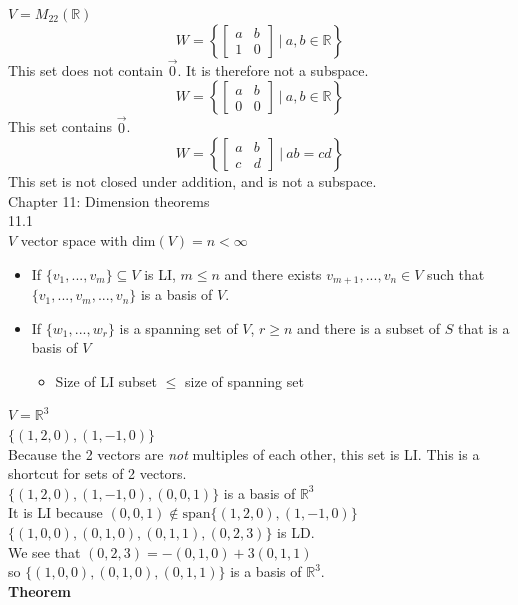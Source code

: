 \documentclass[]{article}
\begin{document}
		$V=M_{22}(\mathbb{R})$\\
		$$W=\left\{\begin{bmatrix}{a}&{b}\\{1}&{0}\end{bmatrix}~|~a,b\in\mathbb{R}\right\}$$
		This set does not contain $\vec{0}$. It is therefore not a subspace.
		$$W=\left\{\begin{bmatrix}{a}&{b}\\{0}&{0}\end{bmatrix}~|~a,b\in\mathbb{R}\right\}$$
		This set contains $\vec{0}$.
		$$W=\left\{\begin{bmatrix}{a}&{b}\\{c}&{d}\end{bmatrix}~|~ab=cd\right\}$$
		This set is not closed under addition, and is not a subspace.
		\pagebreak\\
		\Large{Chapter 11: Dimension theorems}\\
		\large{11.1}\\
		\normalsize
		$V$ vector space with dim$(V)=n<\infty$
		\begin{itemize}
			\item If $\{v_1,...,v_m\}\subseteq V$ is LI, $m\le n$ and there exists $v_{m+1},...,v_n\in V$ such that $\{v_1,...,v_m,...,v_n\}$ is a basis of $V$.
			\item If $\{w_1,...,w_r\}$ is a spanning set of $V$, $r\ge n$ and there is a subset of $S$ that is a basis of $V$
			\begin{itemize}
				\item Size of LI subset $\le$ size of spanning set
			\end{itemize}
		\end{itemize}
		$V=\mathbb{R}^3$\\
		$\{(1,2,0),(1,-1,0)\}$\\
		Because the 2 vectors are \emph{not} multiples of each other, this set is LI. This is a shortcut for sets of 2 vectors.\\
		$\{(1,2,0),(1,-1,0),(0,0,1)\}$ is a basis of $\mathbb{R}^3$\\
		It is LI because $(0,0,1)\notin\text{span}\{(1,2,0),(1,-1,0)\}$\\
		$\{(1,0,0),(0,1,0),(0,1,1),(0,2,3)\}$ is LD.\\
		We see that $(0,2,3)=-(0,1,0)+3(0,1,1)$\\
		so $\{(1,0,0),(0,1,0),(0,1,1)\}$ is a basis of $\mathbb{R}^3$.\\
		\large{\bf Theorem}\\
\end{document}
